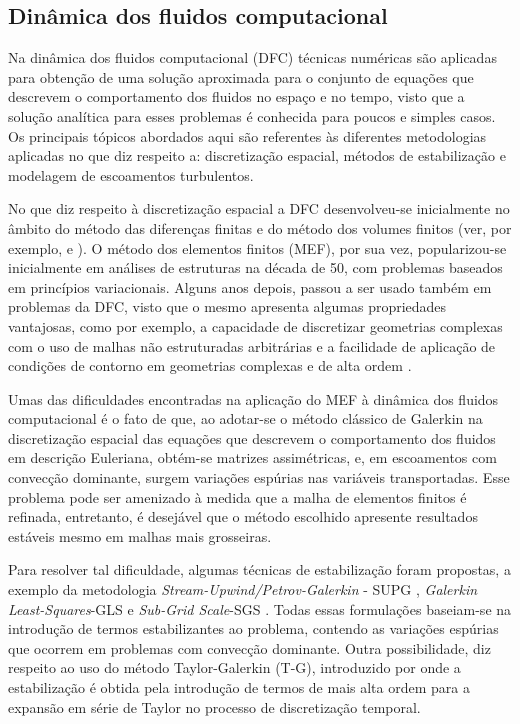 \documentclass[tese_patricia.tex]{subfiles}
\begin{document}
\subsection{Dinâmica dos fluidos computacional}
\label{cfdsection}

Na dinâmica dos fluidos computacional (DFC) técnicas numéricas são aplicadas para obtenção de uma solução aproximada para o conjunto de equações que descrevem o comportamento dos fluidos no espaço e no tempo, visto que a solução analítica para esses problemas é conhecida para poucos e simples casos. Os principais tópicos abordados aqui são referentes às diferentes metodologias aplicadas no que  diz respeito a: discretização espacial, métodos de estabilização e modelagem de escoamentos turbulentos. 

No que diz respeito à discretização espacial a DFC desenvolveu-se inicialmente no âmbito do método das diferenças finitas e do método dos volumes finitos (ver, por exemplo,  e ). O método dos elementos finitos (MEF), por sua vez, popularizou-se inicialmente em análises de estruturas na década de 50, com problemas baseados em princípios variacionais. Alguns anos depois, passou a ser usado também em problemas da DFC, visto que o mesmo apresenta algumas propriedades vantajosas, como por exemplo, a capacidade de discretizar geometrias complexas com o uso de malhas não estruturadas arbitrárias e a facilidade de aplicação de condições de contorno em geometrias complexas e de alta ordem \cite{ZienkiewiczTN:2005,ReddyG:2000}.

Umas das dificuldades encontradas na aplicação do MEF à dinâmica dos fluidos computacional é o fato de que, ao adotar-se o método clássico de Galerkin na discretização espacial das equações que descrevem o comportamento dos fluidos em descrição Euleriana, obtém-se matrizes assimétricas, e, em escoamentos com convecção dominante, surgem variações espúrias nas variáveis transportadas. Esse problema pode ser amenizado à medida que a malha de elementos finitos é refinada, entretanto, é desejável que o método escolhido apresente resultados estáveis mesmo em malhas mais grosseiras.

Para resolver tal dificuldade, algumas técnicas de estabilização foram propostas, a exemplo da metodologia \textit{Stream-Upwind/Petrov-Galerkin} - SUPG \cite{BrooksH:1982}, \textit{Galerkin Least-Squares}-GLS \cite{HughesFH:1989}  e \textit{Sub-Grid Scale}-SGS \cite{Hughes:1995}. Todas essas formulações baseiam-se na introdução de termos estabilizantes ao problema, contendo as variações espúrias que ocorrem em problemas com convecção dominante. Outra possibilidade, diz respeito ao uso do método Taylor-Galerkin (T-G), introduzido por  onde a estabilização é obtida pela introdução de termos de mais alta ordem para a expansão em série de Taylor no processo de discretização temporal.
\end{document}
